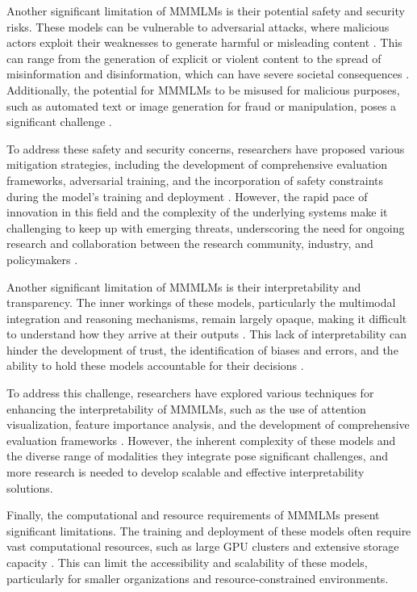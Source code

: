 \documentclass[11pt]{article}
\begin{document}
Another significant limitation of MMMLMs is their potential safety and security risks. These models can be vulnerable to adversarial attacks, where malicious actors exploit their weaknesses to generate harmful or misleading content \cite{ref102}. This can range from the generation of explicit or violent content to the spread of misinformation and disinformation, which can have severe societal consequences \cite{ref103}. Additionally, the potential for MMMLMs to be misused for malicious purposes, such as automated text or image generation for fraud or manipulation, poses a significant challenge \cite{ref103}.

To address these safety and security concerns, researchers have proposed various mitigation strategies, including the development of comprehensive evaluation frameworks, adversarial training, and the incorporation of safety constraints during the model's training and deployment \cite{ref104,ref105}. However, the rapid pace of innovation in this field and the complexity of the underlying systems make it challenging to keep up with emerging threats, underscoring the need for ongoing research and collaboration between the research community, industry, and policymakers \cite{ref105}.

Another significant limitation of MMMLMs is their interpretability and transparency. The inner workings of these models, particularly the multimodal integration and reasoning mechanisms, remain largely opaque, making it difficult to understand how they arrive at their outputs \cite{ref106}. This lack of interpretability can hinder the development of trust, the identification of biases and errors, and the ability to hold these models accountable for their decisions \cite{ref106}.

To address this challenge, researchers have explored various techniques for enhancing the interpretability of MMMLMs, such as the use of attention visualization, feature importance analysis, and the development of comprehensive evaluation frameworks \cite{ref106,ref107}. However, the inherent complexity of these models and the diverse range of modalities they integrate pose significant challenges, and more research is needed to develop scalable and effective interpretability solutions.

Finally, the computational and resource requirements of MMMLMs present significant limitations. The training and deployment of these models often require vast computational resources, such as large GPU clusters and extensive storage capacity \cite{ref101}. This can limit the accessibility and scalability of these models, particularly for smaller organizations and resource-constrained environments.
\end{document}
